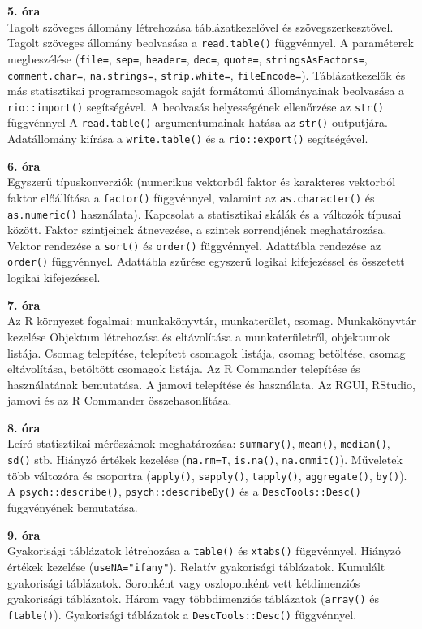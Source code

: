 \documentclass[
]{book}
\begin{document}
\textbf{5. óra}\\
Tagolt szöveges állomány létrehozása táblázatkezelővel és szövegszerkesztővel. Tagolt szöveges állomány beolvasása a \texttt{read.table()} függvénnyel. A paraméterek megbeszélése (\texttt{file=}, \texttt{sep=}, \texttt{header=}, \texttt{dec=}, \texttt{quote=}, \texttt{stringsAsFactors=}, \texttt{comment.char=}, \texttt{na.strings=}, \texttt{strip.white=}, \texttt{fileEncode=}). Táblázatkezelők és más statisztikai programcsomagok saját formátomú állományainak beolvasása a \texttt{rio::import()} segítségével. A beolvasás helyességének ellenőrzése az \texttt{str()} függvénnyel A \texttt{read.table()} argumentumainak hatása az \texttt{str()} outputjára. Adatállomány kiírása a \texttt{write.table()} és a \texttt{rio::export()} segítségével.

\textbf{6. óra}\\
Egyszerű típuskonverziók (numerikus vektorból faktor és karakteres vektorból faktor előállítása a \texttt{factor()} függvénnyel, valamint az \texttt{as.character()} és \texttt{as.numeric()} használata). Kapcsolat a statisztikai skálák és a változók típusai között. Faktor szintjeinek átnevezése, a szintek sorrendjének meghatározása. Vektor rendezése a \texttt{sort()} és \texttt{order()} függvénnyel. Adattábla rendezése az \texttt{order()} függvénnyel. Adattábla szűrése egyszerű logikai kifejezéssel és összetett logikai kifejezéssel.

\textbf{7. óra}\\
Az R környezet fogalmai: munkakönyvtár, munkaterület, csomag. Munkakönyvtár kezelése Objektum létrehozása és eltávolítása a munkaterületről, objektumok listája. Csomag telepítése, telepített csomagok listája, csomag betöltése, csomag eltávolítása, betöltött csomagok listája. Az R Commander telepítése és használatának bemutatása. A jamovi telepítése és használata. Az RGUI, RStudio, jamovi és az R Commander összehasonlítása.

\textbf{8. óra}\\
Leíró statisztikai mérőszámok meghatározása: \texttt{summary()}, \texttt{mean()}, \texttt{median()}, \texttt{sd()} stb. Hiányzó értékek kezelése (\texttt{na.rm=T}, \texttt{is.na()}, \texttt{na.ommit()}). Műveletek több változóra és csoportra (\texttt{apply()}, \texttt{sapply()}, \texttt{tapply()}, \texttt{aggregate()}, \texttt{by()}). A \texttt{psych::describe()}, \texttt{psych::describeBy()} és a \texttt{DescTools::Desc()} függvényének bemutatása.

\textbf{9. óra}\\
Gyakorisági táblázatok létrehozása a \texttt{table()} és \texttt{xtabs()} függvénnyel. Hiányzó értékek kezelése (\texttt{useNA="ifany"}). Relatív gyakorisági táblázatok. Kumulált gyakorisági táblázatok. Soronként vagy oszloponként vett kétdimenziós gyakorisági táblázatok. Három vagy többdimenziós táblázatok (\texttt{array()} és \texttt{ftable()}). Gyakorisági táblázatok a \texttt{DescTools::Desc()} függvénnyel.
\end{document}
